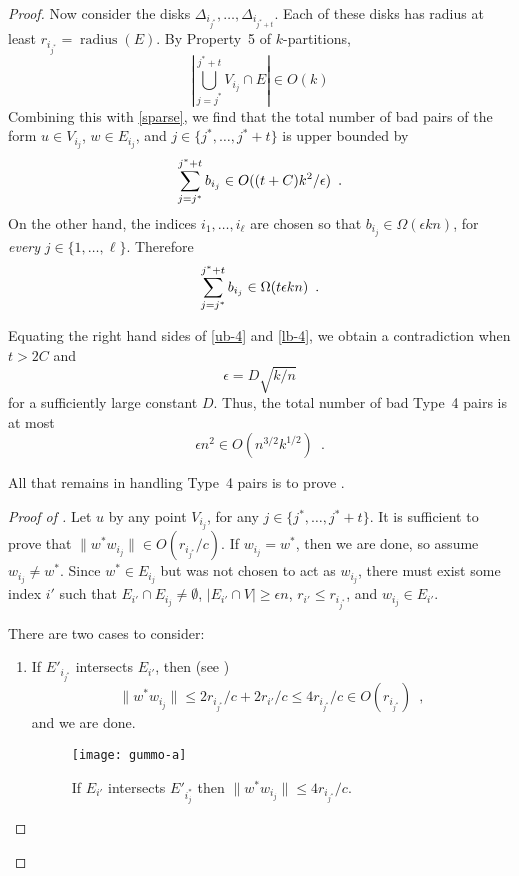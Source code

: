 \documentclass{patmorin}
\DeclareMathOperator{\radius}{radius}
\begin{document}
\begin{proof}
  Now consider the disks
  $\Delta_{i_{j^*}},\ldots,\Delta_{i_{j^*+t}}$. Each of these disks
  has radius at least $r_{i_{j^*}}=\radius(E)$.  By Property~5 of
  $k$-partitions,
  \[
    \left|\bigcup_{j=j^*}^{j^*+t} V_{i_{j}}\cap E\right|
      \in O(k)
  \]
  Combining this with \eqref{sparse}, we find that the total number
  of bad pairs of the form $u\in V_{i_{j}}$, $w\in E_{i_{j}}$,
  and $j\in\{j^*,\ldots,j^*+t\}$ is upper bounded by
  \begin{equation}
     \sum_{j=j^*}^{j^*+t} b_{i_{j}} 
        \in O((t+C)k^2/\epsilon) \enspace . \eqlabel{ub-4}
  \end{equation}
  On the other hand, the indices $i_1,\ldots,i_\ell$ are chosen
  so that $b_{i_j}\in\Omega(\epsilon kn)$, for \emph{every}
  $j\in\{1,\ldots,\ell\}$.  Therefore
  \begin{equation}
    \sum_{j=j^*}^{j^*+t} b_{i_{j}} 
        \in \Omega(t\epsilon kn) \enspace .
        \eqlabel{lb-4}
  \end{equation}
 
  Equating the right hand sides of \eqref{ub-4} and \eqref{lb-4}, we
  obtain a contradiction when $t>2C$ and
  \[
      \epsilon = D\sqrt{k/n}
  \] 
  for a sufficiently large constant $D$.
  Thus, the total number of bad Type~4 pairs is at most
  \[
    \epsilon n^2 \in O(n^{3/2}k^{1/2}) \enspace .
  \]

  All that remains in handling Type~4 pairs is to prove .

  \begin{proof}[Proof of ]
  Let $u$ by any point $V_{i_{j}}$, for any $j\in\{j^*,\ldots,j^*+t\}$.
  It is sufficient to prove that $\|w^*w_{i_{j}}\|\in O(r_{i_{j^*}}/c)$.
  If $w_{i_{j}}=w^*$, then we are done, so assume $w_{i_{j}}\neq
  w^*$.  Since $w^*\in E_{i_{j}}$ but was not chosen to act as
  $w_{i_{j}}$, there must exist some index $i'$ such that $E_{i'}\cap
  E_{i_{j}}\neq\emptyset$, $|E_{i'}\cap V|\ge\epsilon n$, $r_{i'}\le
  r_{i_{j^*}}$, and $w_{i_{j}}\in E_{i'}$.

  There are two cases to consider:
  \begin{enumerate}
    \item 
    If $E'_{i_{j^*}}$ intersects $E_{i'}$, then (see )
    \[
       \|w^*w_{i_j}\|\le 2r_{i_{j^*}}/c + 2r_{i'}/c \le 4r_{i_{j^*}}/c \in O(r_{i_{j^*}}) \enspace ,
    \]
    and we are done. 
    \begin{figure}
      \begin{center}
        \texttt{[image: gummo-a]}
        \caption{If $E_{i'}$ intersects $E'_{i_j^*}$ then $\|w^*w_{i_j}\|\le 4r_{i_{j^*}}/c$.}
      \end{center}
    \end{figure}
  

\end{enumerate}
\end{proof}
\end{proof}
\end{document}
